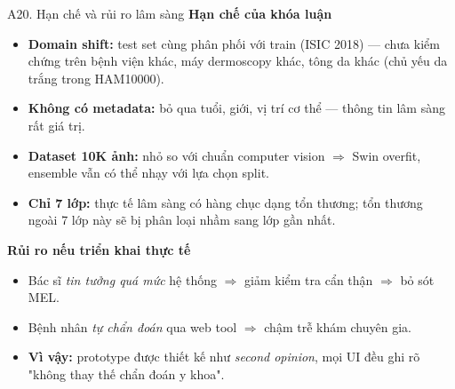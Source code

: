 \documentclass[10pt, aspectratio=169]{beamer}
\begin{document}
\begin{frame}{A20. Hạn chế và rủi ro lâm sàng}
    \footnotesize
    \textbf{Hạn chế của khóa luận}
    \begin{itemize}
        \item \textbf{Domain shift:} test set cùng phân phối với train (ISIC 2018) --- chưa kiểm chứng trên bệnh viện khác, máy dermoscopy khác, tông da khác (chủ yếu da trắng trong HAM10000).
        \item \textbf{Không có metadata:} bỏ qua tuổi, giới, vị trí cơ thể --- thông tin lâm sàng rất giá trị.
        \item \textbf{Dataset 10K ảnh:} nhỏ so với chuẩn computer vision $\Rightarrow$ Swin overfit, ensemble vẫn có thể nhạy với lựa chọn split.
        \item \textbf{Chỉ 7 lớp:} thực tế lâm sàng có hàng chục dạng tổn thương; tổn thương ngoài 7 lớp này sẽ bị phân loại nhầm sang lớp gần nhất.
    \end{itemize}

    \vspace{0.2cm}
    \textbf{Rủi ro nếu triển khai thực tế}
    \begin{itemize}
        \item Bác sĩ \textit{tin tưởng quá mức} hệ thống $\Rightarrow$ giảm kiểm tra cẩn thận $\Rightarrow$ bỏ sót MEL.
        \item Bệnh nhân \textit{tự chẩn đoán} qua web tool $\Rightarrow$ chậm trễ khám chuyên gia.
        \item \textbf{Vì vậy:} prototype được thiết kế như \textit{second opinion}, mọi UI đều ghi rõ "không thay thế chẩn đoán y khoa".
    \end{itemize}
\end{frame}
\end{document}
